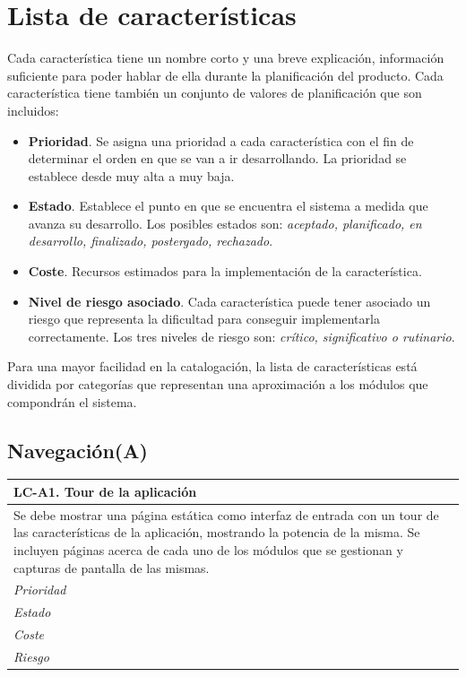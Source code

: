 
% 
%
\section{Lista de características} %
	\label{sec:lista_de_caracteristicas}
	
	Cada característica tiene un nombre corto y una breve explicación, información suficiente para poder hablar de ella durante la planificación del producto. Cada característica tiene también un conjunto de valores de planificación que son incluidos:
	
	\begin{itemize}
		\item{{\bf Prioridad}. Se asigna una prioridad a cada característica con el fin de determinar el orden en que se van a ir desarrollando. La prioridad se establece desde muy alta a muy baja.}
		\item{{\bf Estado}. Establece el punto en que se encuentra el sistema a medida que avanza su desarrollo. Los posibles estados son: {\it aceptado, planificado, en desarrollo, finalizado, postergado, rechazado}.}
		\item{{\bf Coste}. Recursos estimados para la implementación de la característica.}
		\item{{\bf Nivel de riesgo asociado}. Cada característica puede tener asociado un riesgo que representa la dificultad para conseguir implementarla correctamente. Los tres niveles de riesgo son: {\it crítico, significativo o rutinario}.}
	\end{itemize}
	
	Para una mayor facilidad en la catalogación, la lista de características está dividida por categorías que representan una aproximación a los módulos que compondrán el sistema.
%
%
\subsection{Navegación(A)} %
	\label{sub:lc_navegacion}
	
	\begin{center}
		\begin{tabularx}{15cm}{|X|}
			\hline 
				\bf{LC-A1. Tour de la aplicación}\\
			\hline
				Se debe mostrar una página estática como interfaz de entrada con un tour de las características de la aplicación, mostrando la potencia de la misma. Se incluyen páginas acerca de cada uno de los módulos que se gestionan y capturas de pantalla de las mismas.\\
			\hline
				\it{Prioridad}\\
			\hline
				\it{Estado}\\
			\hline
				\it{Coste}\\
			\hline
				\it{Riesgo}\\
			\hline
		\end{tabularx}
	\end{center}
	
